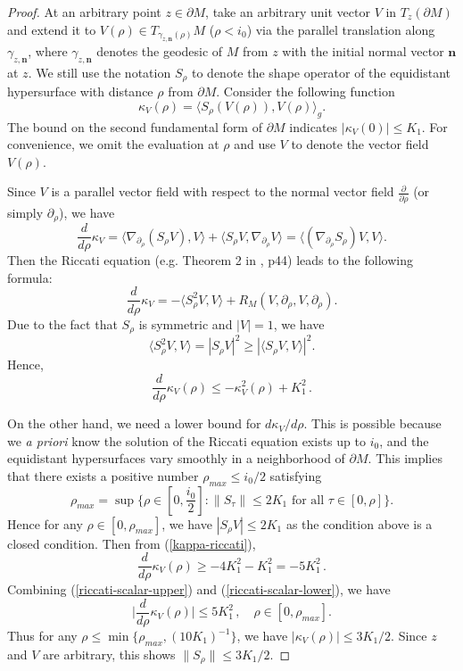 \documentclass[11pt,letterpaper]{amsart}
\numberwithin{equation}{section}
\theoremstyle{definition}
\theoremstyle{plain}
\theoremstyle{definition}
\theoremstyle{plain}
\theoremstyle{definition}
\theoremstyle{plain}
\begin{document}
\begin{proof}
At an arbitrary point $z\in \partial M$, take an arbitrary unit vector $V$ in $T_z (\partial M)$ and extend it to $V(\rho)\in T_{\gamma_{z,\textbf{n}}(\rho)} M$ ($\rho<i_0$) via the parallel translation along $\gamma_{z,\textbf{n}}$, where $\gamma_{z,\textbf{n}}$ denotes the geodesic of $M$ from $z$ with the initial normal vector $\textbf{n}$ at $z$. We still use the notation $S_{\rho}$ to denote the shape operator of the equidistant hypersurface with distance $\rho$ from $\partial M$. Consider the following function
$$\kappa_V (\rho)=\langle S_{\rho} (V(\rho)),V(\rho) \rangle_{g}.$$
The bound on the second fundamental form of $\partial M$ indicates $|\kappa_V(0)|\leqslant K_1$. For convenience, we omit the evaluation at $\rho$ and use $V$ to denote the vector field $V(\rho)$. 

Since $V$ is a parallel vector field with respect to the normal vector field $\frac{\partial}{\partial \rho}$ (or simply $\partial_{\rho}$), we have
\begin{equation*}
\frac{d }{d\rho} \kappa_V = \langle  \nabla_{\partial_{\rho}} (S_{\rho} V) ,V \rangle+ \langle S_{\rho} V, \nabla_{\partial_{\rho}} V\rangle = \langle  (\nabla_{\partial_{\rho}} S_{\rho}) V,V \rangle.
\end{equation*}
Then the Riccati equation (e.g. Theorem 2 in \cite{PP}, p44) leads to the following formula:
\begin{equation}\label{kappa-riccati}
\frac{d }{d\rho} \kappa_V  =  -\langle  S_{\rho}^2 V,V \rangle +R_M(V,\partial_{\rho},V,\partial_{\rho}) .
\end{equation}
Due to the fact that $S_{\rho}$ is symmetric and $|V|=1$, we have
$$\langle  S_{\rho}^2 V,V \rangle = |S_{\rho} V|^2 \geqslant |\langle  S_{\rho} V,V \rangle|^2 .$$
Hence,
\begin{equation}\label{riccati-scalar-upper}
\frac{d }{d\rho} \kappa_V (\rho) \leqslant -\kappa_V^2 (\rho) + K_1^2\, .
\end{equation}

On the other hand, we need a lower bound for $d\kappa_V/d\rho$. This is possible because we \emph{a priori} know the solution of the Riccati equation exists up to $i_0$, and the equidistant hypersurfaces vary smoothly in a neighborhood of $\partial M$. This implies that there exists a positive number $\rho_{max}\leqslant i_0/2$ satisfying
$$\rho_{max}=\sup \big\{\rho\in [0,\frac{i_0}{2}]: \|S_{\tau}\|\leqslant 2K_1 \textrm{ for all }\tau\in [0,\rho] \big\}.$$
Hence for any $\rho\in [0,\rho_{max}]$, we have $|S_{\rho} V|\leqslant 2K_1$ as the condition above is a closed condition. Then from (\ref{kappa-riccati}),
\begin{equation}\label{riccati-scalar-lower}
\frac{d }{d\rho} \kappa_V (\rho) \geqslant -4K_1^2-K_1^2=-5K_1^2\, .
\end{equation}
Combining (\ref{riccati-scalar-upper}) and (\ref{riccati-scalar-lower}), we have
$$\big| \frac{d }{d\rho} \kappa_V (\rho) \big| \leqslant 5K_1^2\, , \quad \rho\in [0,\rho_{max}].$$
Thus for any $\rho\leqslant \min\{\rho_{max},(10K_1)^{-1}\}$, we have $|\kappa_V(\rho)|\leqslant 3K_1/2$. Since $z$ and $V$ are arbitrary, this shows $\|S_{\rho}\|\leqslant 3K_1/2$. 


\end{proof}
\end{document}
